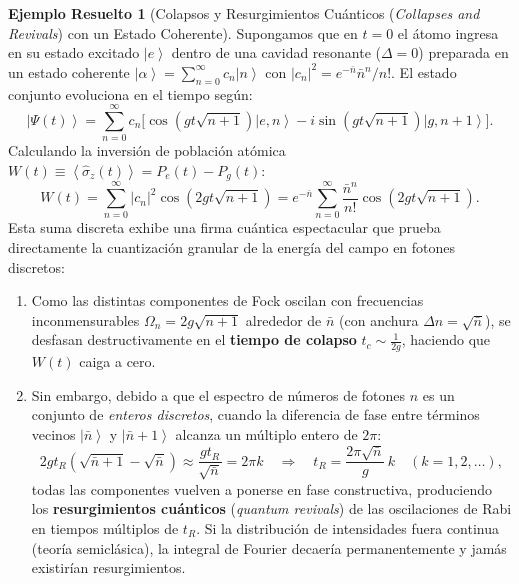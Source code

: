 \documentclass[11pt,a4paper,twoside]{report}
\theoremstyle{definition}
\newtheorem{ejemplo}{Ejemplo Resuelto}[chapter]
\theoremstyle{plain}
\theoremstyle{remark}
\newcommand{\ket}[1]{\left| #1 \right\rangle}
\newcommand{\expval}[1]{\left\langle #1 \right\rangle}
\newcommand{\op}[1]{\hat{#1}}
\begin{document}
\begin{ejemplo}[Colapsos y Resurgimientos Cuánticos (\textit{Collapses and Revivals}) con un Estado Coherente]
Supongamos que en $t = 0$ el átomo ingresa en su estado excitado $\ket{e}$ dentro de una cavidad resonante ($\Delta = 0$) preparada en un estado coherente $\ket{\alpha} = \sum_{n=0}^{\infty} c_n \ket{n}$ con $|c_n|^2 = e^{-\bar{n}}\bar{n}^n / n!$. El estado conjunto evoluciona en el tiempo según:
\begin{equation}
    \ket{\Psi(t)} = \sum_{n=0}^{\infty} c_n \Big[ \cos\left(gt\sqrt{n+1}\right)\ket{e, n} - i\sin\left(gt\sqrt{n+1}\right)\ket{g, n+1} \Big].
\end{equation}
Calculando la inversión de población atómica $W(t) \equiv \expval{\op{\sigma}_z(t)} = P_e(t) - P_g(t)$:
\begin{equation}
    W(t) = \sum_{n=0}^{\infty} |c_n|^2 \cos\left(2gt\sqrt{n+1}\right) = e^{-\bar{n}}\sum_{n=0}^{\infty} \frac{\bar{n}^n}{n!} \cos\left(2gt\sqrt{n+1}\right).
\end{equation}
Esta suma discreta exhibe una firma cuántica espectacular que prueba directamente la cuantización granular de la energía del campo en fotones discretos:
\begin{enumerate}[label=\alph*)]
    \item Como las distintas componentes de Fock oscilan con frecuencias inconmensurables $\Omega_n = 2g\sqrt{n+1}$ alrededor de $\bar{n}$ (con anchura $\Delta n = \sqrt{\bar{n}}$), se desfasan destructivamente en el \textbf{tiempo de colapso} $t_c \sim \frac{1}{2g}$, haciendo que $W(t)$ caiga a cero.
    \item Sin embargo, debido a que el espectro de números de fotones $n$ es un conjunto de \emph{enteros discretos}, cuando la diferencia de fase entre términos vecinos $\ket{\bar{n}}$ y $\ket{\bar{n}+1}$ alcanza un múltiplo entero de $2\pi$:
    \begin{equation}
        2gt_R\left(\sqrt{\bar{n}+1} - \sqrt{\bar{n}}\right) \approx \frac{gt_R}{\sqrt{\bar{n}}} = 2\pi k \quad \Longrightarrow \quad t_R = \frac{2\pi\sqrt{\bar{n}}}{g}\,k \quad (k = 1, 2, \dots),
    \end{equation}
    todas las componentes vuelven a ponerse en fase constructiva, produciendo los \textbf{resurgimientos cuánticos} (\textit{quantum revivals}) de las oscilaciones de Rabi en tiempos múltiplos de $t_R$. Si la distribución de intensidades fuera continua (teoría semiclásica), la integral de Fourier decaería permanentemente y jamás existirían resurgimientos.
\end{enumerate}
\end{ejemplo}
\end{document}
